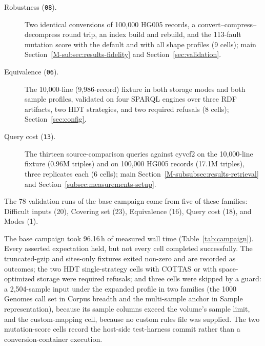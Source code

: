 \documentclass[11pt]{article}
\begin{document}
\begin{description}
\item[Robustness (\texttt{08}).] Two identical conversions of 100,000 HG005 records, a convert--compress--decompress round trip, an index build and rebuild, and the 113-fault mutation score with the default and with all shape profiles (9 cells); main Section~\ref{M-subsec:results-fidelity} and Section~\ref{sec:validation}.
\item[Equivalence (\texttt{06}).] The 10,000-line (9,986-record) fixture in both storage modes and both sample profiles, validated on four SPARQL engines over three RDF artifacts, two HDT strategies, and two required refusals (8 cells); Section~\ref{sec:config}.
\item[Query cost (\texttt{13}).] The thirteen source-comparison queries against cyvcf2 on the 10,000-line fixture (0.96M triples) and on 100,000 HG005 records (17.1M triples), three replicates each (6 cells); main Section~\ref{M-subsubsec:results-retrieval} and Section~\ref{subsec:measurements-setup}.
\end{description}
The 78 validation runs of the base campaign come from five of these families: Difficult inputs (20), Covering set (23), Equivalence (16), Query cost (18), and Modes (1).

The base campaign took 96.16\,h of measured wall time (Table~\ref{tab:campaign}).
Every asserted expectation held, but not every cell completed successfully.
The truncated-gzip and sites-only fixtures exited non-zero and are recorded as outcomes; the two HDT single-strategy cells with COTTAS or with space-optimized storage were required refusals; and three cells were skipped by a guard: a 2,504-sample input under the expanded profile in two families (the 1000 Genomes call set in Corpus breadth and the multi-sample anchor in Sample representation), because its sample columns exceed the volume's sample limit, and the custom-mapping cell, because no custom rules file was supplied.
The two mutation-score cells record the host-side test-harness commit rather than a conversion-container execution.
\end{document}

